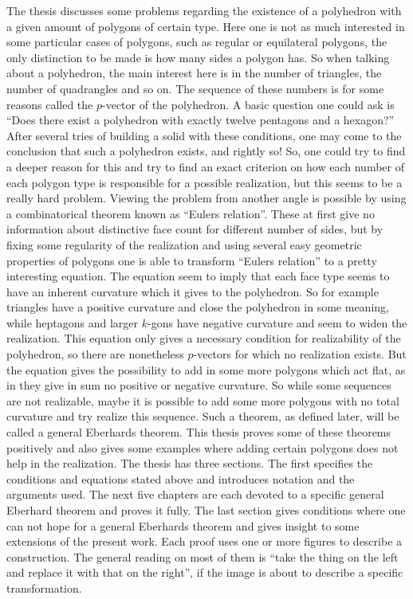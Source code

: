 The thesis discusses some problems regarding the existence of a polyhedron with a given amount of polygons of certain type. Here one is not as much interested in some particular cases of polygons, such as regular or equilateral polygons, the only distinction to be made is how many sides a polygon has. So when talking about a polyhedron, the main interest here is in the number of triangles, the number of quadrangles and so on. The sequence of these numbers is for some reasons called the $p$-vector of the polyhedron. A basic question one could ask is ``Does there exist a polyhedron with exactly twelve pentagons and a hexagon?'' After several tries of building a solid with these conditions, one may come to the conclusion that such a polyhedron exists, and rightly so! So, one could try to find a deeper reason for this and try to find an exact criterion on how each number of each polygon type is responsible for a possible realization, but this seems to be a really hard problem. Viewing the problem from another angle is possible by using a combinatorical theorem known as ``Eulers relation''. These at first give no information about distinctive face count for different number of sides, but by fixing some regularity of the realization and using several easy geometric properties of polygons one is able to transform ``Eulers relation'' to a pretty interesting equation. The equation seem to imply that each face type seems to have an inherent curvature which it gives to the polyhedron. So for example triangles have a positive curvature and close the polyhedron in some meaning, while heptagons and larger $k$-gons have negative curvature and seem to widen the realization. This equation only gives a necessary condition for realizability of the polyhedron, so there are nonetheless $p$-vectors for which no realization exists. But the equation gives the possibility to add in some more polygons which act flat, as in they give in sum no positive or negative curvature. So while some sequences are not realizable, maybe it is possible to add some more polygons with no total curvature and try realize this sequence. Such a theorem, as defined later, will be called a general Eberhards theorem. This thesis proves some of these theorems positively and also gives some examples where adding certain polygons does not help in the realization. The thesis has three sections. The first specifies the conditions and equations stated above and introduces notation and the arguments used. The next five chapters are each devoted to a specific general Eberhard theorem and proves it fully. The last section gives conditions where one can not hope for a general Eberhards theorem and gives insight to some extensions of the present work. Each proof uses one or more figures to describe a construction. The general reading on most of them is ``take the thing on the left and replace it with that on the right'', if the image is about to describe a specific transformation.